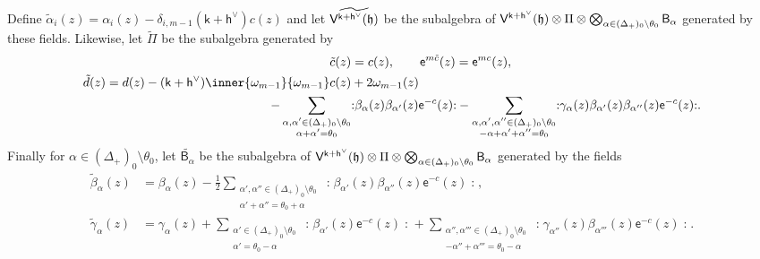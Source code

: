 \documentclass[10pt,a4paper]{amsart}
\numberwithin{equation}{section}
\newcommand{\ee}{\mathsf{e}}   %
\newcommand{\kk}{\mathsf{k}}   %
\DeclarePairedDelimiter{\brac}{\lparen}{\rparen}   %
\newcommand{\no}[1]{\mathopen{:} #1 \mathclose{:}} %
\newcommand{\VOA}[1]{\mathsf{#1}}    %
\newcommand{\cartan}{\mathfrak{h}}
\newcommand{\cox}{\mathsf{h}}                                        %
\newcommand{\dcox}{\coroot{\cox}}                                    %
\newcommand{\proots}{\Delta_+}                                       %
\newcommand{\sroot}[1]{\alpha_{#1}}                                  %
\newcommand{\tsroot}[1]{\tilde{\alpha}_{#1}}                         %
\newcommand{\hroot}{\theta}                                          %
\newcommand{\fwt}[1]{\omega_{#1}}                                    %
\newcommand{\coroot}[1]{#1^{\vee}}                                   %
\newcommand{\uaffvoa}[2]{\VOA{V}^{#1}\brac{#2}}                   %
\newcommand{\bgvoa}{\VOA{B}}                                      %
\theoremstyle{plain}
\begin{document}
Define $\tsroot{i}(z) = \sroot{i}(z)-\delta_{i,m-1}(\kk+\dcox)c(z)$ and let $\widetilde{\uaffvoa{\kk+\dcox}{\cartan}}$ be the subalgebra of $\uaffvoa{\kk+\dcox}{\cartan} \otimes \Pi \otimes \bigotimes_{\alpha \in (\proots)_0 \setminus \hroot_0} \bgvoa_\alpha$ generated by these fields. Likewise, let $\widetilde{\Pi}$ be the subalgebra generated by
%
\begin{equation} \label{eq:tildeHalfLatHook}
\begin{aligned}
    \tilde{c}(z)& = c(z), \qquad 
    \ee^{m\tilde{c}}(z) = \ee^{mc}(z), \\
    \tilde{d}(z) = d(z) 
    - (\kk+\dcox)\inner{\fwt{m-1}}{\fwt{m-1}} c(z)&
    + 2 \fwt{m-1}(z) \\
    - \sum_{\substack{\alpha,\alpha' \in  (\proots)_0 \setminus \hroot_0 \\ \alpha+\alpha'=\hroot_0}}& \no{\beta_\alpha (z) \beta_{\alpha'}(z)\ee^{-c}(z)} 
    - \sum_{\substack{\alpha,\alpha',\alpha'' \in  (\proots)_0 \setminus \hroot_0 \\ -\alpha+\alpha'+\alpha''=\hroot_0}} \no{\gamma_\alpha(z) \beta_{\alpha'} (z) \beta_{\alpha''}(z)\ee^{-c}(z)}.
\end{aligned}
\end{equation}
%
Finally for $\alpha \in  (\proots)_0 \setminus \hroot_0$, let $\widetilde{\bgvoa_\alpha}$ be the subalgebra of $\uaffvoa{\kk+\dcox}{\cartan} \otimes \Pi \otimes \bigotimes_{\alpha \in (\proots)_0 \setminus \hroot_0} \bgvoa_\alpha$ generated by the fields
%
\begin{equation} \label{eq:tildeGhostsHook}
\begin{aligned}
    \tilde{\beta}_\alpha(z) &= \beta_\alpha(z)
    - \frac{1}{2}\sum_{\substack{\alpha',\alpha'' \in  (\proots)_0 \setminus \hroot_0 \\ \alpha'+\alpha''=\hroot_0+\alpha}} \no{\beta_{\alpha'} (z) \beta_{\alpha''}(z)\ee^{-c}(z)}, \\
    \tilde{\gamma}_\alpha(z) &= \gamma_\alpha(z) 
    + \sum_{\substack{\alpha' \in (\proots)_0 \setminus \hroot_0 \\ \alpha'=\hroot_0-\alpha}}\no{\beta_{\alpha'}(z)\ee^{-c}(z)}
    + \sum_{\substack{\alpha'',\alpha''' \in (\proots)_0 \setminus \hroot_0 \\ -\alpha''+\alpha'''=\hroot_0-\alpha}}\no{\gamma_{\alpha''}(z)\beta_{\alpha'''}(z)\ee^{-c}(z)}.
\end{aligned}
\end{equation}
\end{document}
